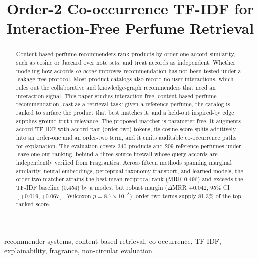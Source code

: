 \documentclass[conference]{IEEEtran}
\begin{document}
\title{Order-2 Co-occurrence TF-IDF for Interaction-Free Perfume Retrieval}

\author{
}

\maketitle

\begin{abstract}
Content-based perfume recommenders rank products by order-one accord similarity, such as
cosine or Jaccard over note sets, and treat accords as independent. Whether modeling how
accords \emph{co-occur} improves recommendation has not been tested under a leakage-free
protocol. Most product catalogs also record no user interactions, which rules out the
collaborative and knowledge-graph recommenders that need an interaction signal. This paper
studies interaction-free, content-based perfume recommendation, cast as a retrieval task:
given a reference perfume, the catalog is ranked to surface the product that best matches
it, and a held-out inspired-by edge supplies ground-truth relevance. The proposed matcher
is parameter-free. It augments accord TF-IDF with accord-pair (order-two) tokens, its
cosine score splits additively into an order-one and an order-two term, and it emits
auditable co-occurrence paths for explanation. The evaluation covers 340 products and 209
reference perfumes under leave-one-out ranking, behind a three-source firewall whose query
accords are independently verified from Fragrantica. Across fifteen methods spanning
marginal similarity, neural embeddings, perceptual-taxonomy transport, and learned models,
the order-two matcher attains the best mean reciprocal rank (MRR 0.496) and exceeds the
TF-IDF baseline (0.454) by a modest but robust margin ($\Delta$MRR $+0.042$, 95\% CI
$[+0.019,+0.067]$, Wilcoxon $p=8.7\times10^{-8}$); order-two terms supply 81.3\% of the
top-ranked score.
\end{abstract}

\begin{IEEEkeywords}
recommender systems, content-based retrieval, co-occurrence, TF-IDF, explainability,
fragrance, non-circular evaluation
\end{IEEEkeywords}
\end{document}
